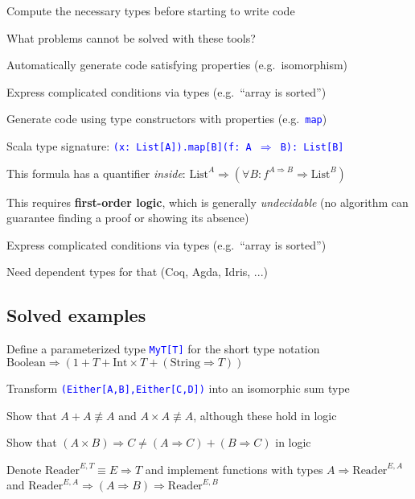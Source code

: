 Compute the necessary types before starting to write code

What problems cannot be solved with these tools?

Automatically generate code satisfying properties (e.g.\ isomorphism)

Express complicated conditions via types (e.g.\ ``array is sorted'') 

Generate code using type constructors with properties (e.g.\ \texttt{\textcolor{blue}{\footnotesize{}map}})

Scala type signature: \texttt{\textcolor{blue}{\footnotesize{}(x:\ List{[}A{]}).map{[}B{]}(f:\ A
$\Rightarrow$ B):\ List{[}B{]}}}{\footnotesize\par}

This formula has a quantifier \emph{inside}: $\text{List}^{A}\Rightarrow(\forall B:f^{A\Rightarrow B}\Rightarrow\text{List}^{B})$

This requires \textbf{first-order logic}, which is generally \emph{undecidable}
(no algorithm can guarantee finding a proof or showing its absence)

Express complicated conditions via types (e.g.\ ``array is sorted'')

Need dependent types for that (Coq, Agda, Idris, ...)

\subsection{Solved examples}

Define a parameterized type \texttt{\textcolor{blue}{\footnotesize{}MyT{[}T{]}}}
for the short type notation {\footnotesize{}$\text{Boolean}\Rightarrow\left(1+T+\text{Int}\times T+(\text{String}\Rightarrow T)\right)$}{\footnotesize\par}

Transform \texttt{\textcolor{blue}{\footnotesize{}(Either{[}A,B{]},Either{[}C,D{]})}}
into an isomorphic sum type

Show that {\footnotesize{}$A+A\not\equiv A$} and {\footnotesize{}$A\times A\not\equiv A$},
although these hold in logic

Show that{\footnotesize{} $(A\times B)\Rightarrow C\neq(A\Rightarrow C)+(B\Rightarrow C)$}
in logic

Denote {\footnotesize{}$\text{Reader}^{E,T}\equiv E\Rightarrow T$}
and implement functions with types {\footnotesize{}$A\Rightarrow\text{Reader}^{E,A}$}
and {\footnotesize{}$\text{Reader}^{E,A}\Rightarrow(A\Rightarrow B)\Rightarrow\text{Reader}^{E,B}$}{\footnotesize\par}

